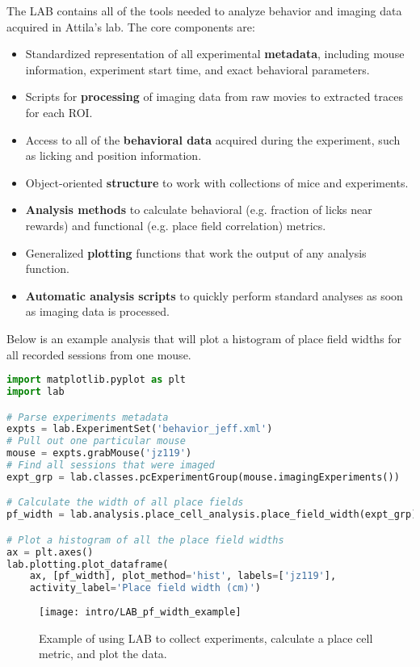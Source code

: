 The LAB contains all of the tools needed to analyze behavior and imaging data acquired in Attila's lab.
The core components are:
\begin{itemize}
	\item{Standardized representation of all experimental \textbf{metadata}, including mouse information, experiment start time, and exact behavioral parameters.}
	\item{Scripts for \textbf{processing} of imaging data from raw movies to extracted traces for each ROI.}
	\item{Access to all of the \textbf{behavioral data} acquired during the experiment, such as licking and position information.}
	\item{Object-oriented \textbf{structure} to work with collections of mice and experiments.}
	\item{\textbf{Analysis methods} to calculate behavioral (e.g. fraction of licks near rewards) and functional (e.g. place field correlation) metrics.}
	\item{Generalized \textbf{plotting} functions that work the output of any analysis function.}
	\item{\textbf{Automatic analysis scripts} to quickly perform standard analyses as soon as imaging data is processed.}
\end{itemize}

Below is an example analysis that will plot a histogram of place field widths for all recorded sessions from one mouse.

\begin{lstlisting}[language=Python]
import matplotlib.pyplot as plt
import lab

# Parse experiments metadata
expts = lab.ExperimentSet('behavior_jeff.xml')
# Pull out one particular mouse
mouse = expts.grabMouse('jz119')
# Find all sessions that were imaged
expt_grp = lab.classes.pcExperimentGroup(mouse.imagingExperiments())

# Calculate the width of all place fields
pf_width = lab.analysis.place_cell_analysis.place_field_width(expt_grp)

# Plot a histogram of all the place field widths
ax = plt.axes()
lab.plotting.plot_dataframe(
	ax, [pf_width], plot_method='hist', labels=['jz119'],
	activity_label='Place field width (cm)')

\end{lstlisting}

\begin{figure}[!h]
	\centering
	\texttt{[image: intro/LAB\_pf\_width\_example]}
	\caption[Example histogram]{Example of using LAB to collect experiments, calculate a place cell metric, and plot the data.}
	\label{fig:intro:techniques:pf_width}
\end{figure}


